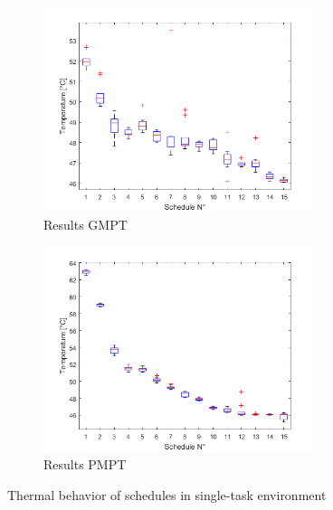 \begin{figure}[H]
\begin{subfigure}{.5\textwidth}
  \centering
  \includegraphics[height=6cm]{figures/eval_gmpt1}
  \caption{Results GMPT}
  \label{fig:i_evg1_n}
\end{subfigure}%
\begin{subfigure}{.5\textwidth}
  \centering
  \includegraphics[height=6cm]{figures/eval_pmpt}
  \caption{Results PMPT}
  \label{fig:i_evp_n}
\end{subfigure}
\caption[Results Single-Task Notebook]{Thermal behavior of schedules in single-task environment}
\label{fig:i_eva_gp_n}
\end{figure}